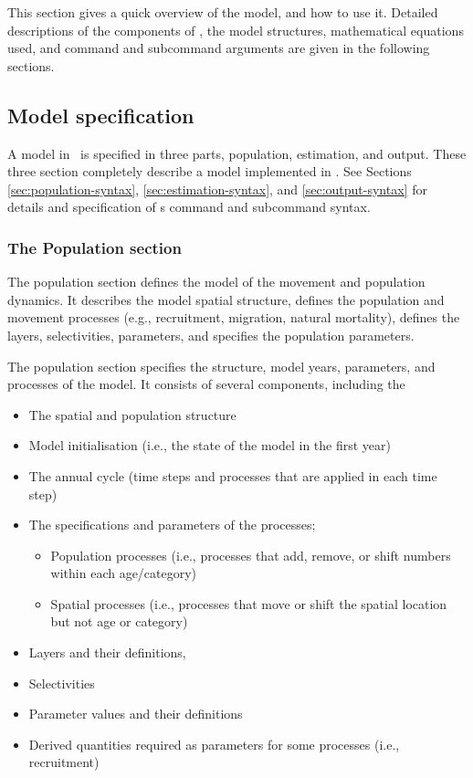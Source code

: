 This section gives a quick overview of the model, and how to use it. Detailed descriptions of the components of \SPM, the model structures, mathematical equations used, and command and subcommand arguments are given in the following sections.

\subsection{Model specification}

A model in \SPM\ is specified in three parts, population, estimation, and output. These three section completely describe a model implemented in \SPM. See Sections \ref{sec:population-syntax}, \ref{sec:estimation-syntax}, and \ref{sec:output-syntax} for details and specification of \SPM s command and subcommand syntax. 

\subsubsection{The Population section}

The population section defines the model of the movement and population dynamics. It describes the model spatial structure, defines the population and movement processes (e.g., recruitment, migration, natural mortality), defines the layers, selectivities, parameters, and specifies the population parameters.

The population section specifies the structure, model years, parameters, and processes of the model. It consists of several components, including the 
\begin{itemize}
  \item The spatial and population structure
  \item Model initialisation (i.e., the state of the model in the first year)
  \item The annual cycle (time steps and processes that are applied in each time step)
  \item The specifications and parameters of the processes;
  \begin{itemize}
    \item Population processes (i.e., processes that add, remove, or shift numbers within each age/category)
    \item Spatial processes (i.e., processes that move or shift the spatial location but not age or category)
  \end{itemize}
  \item Layers and their definitions,
  \item Selectivities
  \item Parameter values and their definitions
  \item Derived quantities required as parameters for some processes (i.e., recruitment)
\end{itemize}

